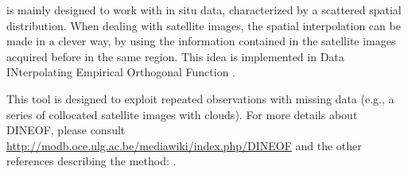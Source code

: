 \diva is mainly designed to work with in situ data, characterized by a scattered spatial distribution. When dealing with satellite images, the spatial interpolation can be made in a clever way, by using the information contained in the satellite images acquired before in the same region. This idea is implemented in Data INterpolating Empirical Orthogonal Function \citep[DINEOF;][]{BECKERS03,ALVERA05}.

This tool is designed to exploit repeated observations with missing data (e.g., a series of collocated satellite images with clouds). 
For more details about DINEOF, please consult \url{http://modb.oce.ulg.ac.be/mediawiki/index.php/DINEOF} and the other references describing the method: \citet{ALVERA05,ALVERA07,ALVERA09,BECKERS06}.


